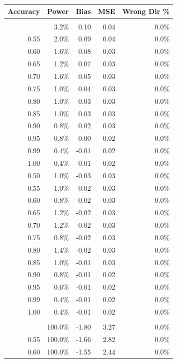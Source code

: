 \documentclass[
  letterpaper,
  DIV=11,
  numbers=noendperiod]{scrartcl}
\begin{document}
\begin{table}
{\fontsize{12.0pt}{14.4pt}\selectfont
\begin{tabular*}{\linewidth}{@{\extracolsep{\fill}}rrrrr}
\toprule
Accuracy & Power & Bias & MSE & Wrong Dir \% \\ 
\midrule\addlinespace[2.5pt]
\multicolumn{5}{l}{A} \\[2.5pt] 
\midrule\addlinespace[2.5pt]
0.50 & 3.2\% & 0.10 & 0.04 & 0.0\% \\ 
0.55 & 2.0\% & 0.09 & 0.04 & 0.0\% \\ 
0.60 & 1.6\% & 0.08 & 0.03 & 0.0\% \\ 
0.65 & 1.2\% & 0.07 & 0.03 & 0.0\% \\ 
0.70 & 1.6\% & 0.05 & 0.03 & 0.0\% \\ 
0.75 & 1.0\% & 0.04 & 0.03 & 0.0\% \\ 
0.80 & 1.0\% & 0.03 & 0.03 & 0.0\% \\ 
0.85 & 1.0\% & 0.03 & 0.03 & 0.0\% \\ 
0.90 & 0.8\% & 0.02 & 0.03 & 0.0\% \\ 
0.95 & 0.8\% & 0.00 & 0.02 & 0.0\% \\ 
0.99 & 0.4\% & -0.01 & 0.02 & 0.0\% \\ 
1.00 & 0.4\% & -0.01 & 0.02 & 0.0\% \\ 
0.50 & 1.0\% & -0.03 & 0.03 & 0.0\% \\ 
0.55 & 1.0\% & -0.02 & 0.03 & 0.0\% \\ 
0.60 & 0.8\% & -0.02 & 0.03 & 0.0\% \\ 
0.65 & 1.2\% & -0.02 & 0.03 & 0.0\% \\ 
0.70 & 1.2\% & -0.02 & 0.03 & 0.0\% \\ 
0.75 & 0.8\% & -0.02 & 0.03 & 0.0\% \\ 
0.80 & 1.4\% & -0.02 & 0.03 & 0.0\% \\ 
0.85 & 1.0\% & -0.01 & 0.03 & 0.0\% \\ 
0.90 & 0.8\% & -0.01 & 0.02 & 0.0\% \\ 
0.95 & 0.6\% & -0.01 & 0.02 & 0.0\% \\ 
0.99 & 0.4\% & -0.01 & 0.02 & 0.0\% \\ 
1.00 & 0.4\% & -0.01 & 0.02 & 0.0\% \\ 
\midrule\addlinespace[2.5pt]
\multicolumn{5}{l}{B} \\[2.5pt] 
\midrule\addlinespace[2.5pt]
0.50 & 100.0\% & -1.80 & 3.27 & 0.0\% \\ 
0.55 & 100.0\% & -1.66 & 2.82 & 0.0\% \\ 
0.60 & 100.0\% & -1.55 & 2.44 & 0.0\% \\ 

\end{tabular*}}
\end{table}
\end{document}
